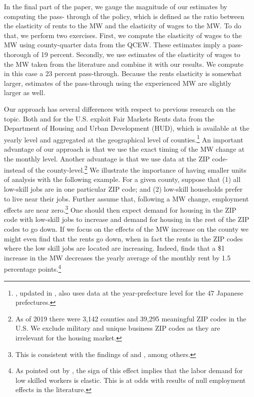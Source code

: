 In the final part of the paper, we gauge the magnitude of our estimates by computing the pass-
through of the policy, which is defined as the ratio between the elasticity of rents to the MW 
and the elasticity of wages to the MW. To do that, we perform two exercises. First, we compute
the elasticity of wages to the MW using county-quarter data from the QCEW. These estimates
imply a pass-thorough of 19 percent. Secondly, we use estimates of the elasticity of wages 
to the MW taken from the literature and combine it with our results. We compute in this case a 
23 percent pass-through. Because the rents elasticity is somewhat larger, estimates of the 
pass-through using the experienced MW are slightly larger as well.

Our approach has several differences with respect to previous research on the topic. Both 
\textcite{Tidemann2018} and \textcite{Yamagishi2019} for the U.S. exploit Fair Markets Rents data 
from the Department of Housing and Urban Development (HUD), which is available at the yearly 
level and aggregated at the geographical level of counties.\footnote{\textcite{Yamagishi2019}, 
	updated in \textcite{Yamagishi2020}, also uses data at the year-prefecture level for the 47 
	Japanese prefectures.}
An important advantage of our approach is that we use the exact timing of the MW change at 
the monthly level. 
Another advantage is that we use data at the ZIP code- instead of the county-level.\footnote{
	As of 2019 there were 3,142 counties and 39,295 meaningful ZIP codes in the U.S. We exclude 
	military and unique business ZIP codes as they are irrelevant for the housing market.} 
We illustrate the importance of having smaller units of analysis with the following example. 
For a given county, suppose that (1) all low-skill jobs are in one particular ZIP code; and 
(2) low-skill households prefer to live near their jobs. Further assume that, following a MW 
change, employment effects are near zero.\footnote{This is consistent with the findings of 
	\textcite{CardKrueger2000} and \textcite{CegnizEtAl2019}, among others.} 
One should then expect demand for housing in the ZIP code with low-skill jobs to increase and 
demand for housing in the rest of the ZIP codes to go down. If we focus on the effects of the 
MW increase on the county we might even find that the rents go down, when in fact the rents in 
the ZIP codes where the low skill jobs are located are increasing. Indeed, \textcite{Tidemann2018} 
finds that a \$1 increase in the MW decreases the yearly average of the monthly rent by 1.5 
percentage points.\footnote{As pointed out by \textcite{Tidemann2018}, the sign of this 
	effect 	implies that the labor demand for low skilled workers is elastic. This is at 
	odds with results of null employment effects in the literature.} 

